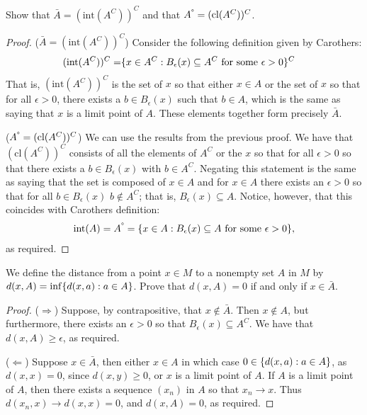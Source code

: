 \begin{exercise}{24}
Show that $\bar{A} =(\text{int}(A^C))^C$ and that $A^{\text{\degree}} =(\text{cl}(A^C))^C$.
\end{exercise}
\begin{proof}
($\bar{A} =(\text{int}(A^C))^C$)
Consider the following definition given by Carothers:
\begin{align*}
    (\text{int}(A^C))^C 
    =& \set{x\in A^C:B_\epsilon(x)\subseteq A^C\text{ for some }\epsilon>0}^C
\end{align*}
That is, $(\text{int}(A^C))^C$ is the set of $x$ so that either $x\in A$ or the set of $x$ so that for all $\epsilon>0$, there exists a $b\in B_\epsilon(x)$ such that $b\in A$, which is the same as saying that $x$ is a limit point of $A$. 
These elements together form precisely $\bar{A}$.

($A^{\text{\degree}} =(\text{cl}(A^C))^C$)
We can use the results from the previous proof.
We have that $(\text{cl}(A^C))^C$ consists of all the elements of $A^C$ or the $x$ so that for all $\epsilon>0$ so that there exists a $b\in B_\epsilon(x)$ with $b\in A^C$.
Negating this statement is the same as saying that the set is composed of $x\in A$ and for $x\in A$ there exists an $\epsilon>0$ so that for all $b\in B_\epsilon(x)$ $b\notin A^C$; 
that is, $B_\epsilon(x)\subseteq A$.
Notice, however, that this coincides with Carothers definition:
\begin{align*}
    \text{int}(A)=A^{\text{\degree}}=\set{x\in A:B_\epsilon(x)\subseteq A\text{ for some }\epsilon>0},
\end{align*}
as required.
\end{proof} 

\begin{exercise}{26}
We define the distance from a point $x\in M$ to a nonempty set $A$ in $M$ by $d(x,A)=\inf\set{d(x,a):a\in A}$.
Prove that $d(x,A)=0$ if and only if $x\in \bar{A}$.
\end{exercise}
\begin{proof}
($\Rightarrow$) 
Suppose, by contrapositive, that $x\notin\bar{A}$.
Then $x\notin A$, but furthermore, there exists an $\epsilon>0$ so that $B_\epsilon(x)\subseteq A^C$.
We have that $d(x,A)\geq\epsilon$, as required.

($\Leftarrow$) 
Suppose $x\in\bar{A}$, then either $x\in A$ in which case $0\in\set{d(x,a):a\in A}$, as $d(x,x)=0$, since $d(x,y)\geq 0$, or $x$ is a limit point of $A$.
If $A$ is a limit point of $A$, then there exists a sequence $(x_n)$ in $A$ so that $x_n\to x$.
Thus $d(x_n,x)\to d(x,x)=0$, and $d(x,A)=0$, as required.
\end{proof} 

